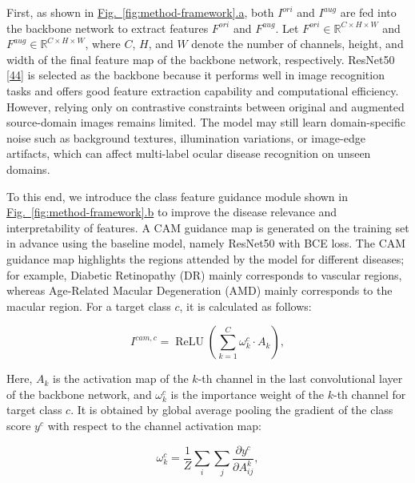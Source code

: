 First, as shown in \hyperref[fig:method-framework]{Fig.~\ref*{fig:method-framework}.a}, both \(I^{ori}\) and \(I^{aug}\) are fed into the backbone network to extract features \(F^{ori}\) and \(F^{aug}\). Let \(F^{ori} \in \mathbb{R}^{C \times H \times W}\) and \(F^{aug} \in \mathbb{R}^{C \times H \times W}\), where \(C\), \(H\), and \(W\) denote the number of channels, height, and width of the final feature map of the backbone network, respectively. ResNet50 \hyperref[_RefResNet2016]{{[}44{]}} is selected as the backbone because it performs well in image recognition tasks and offers good feature extraction capability and computational efficiency. However, relying only on contrastive constraints between original and augmented source-domain images remains limited. The model may still learn domain-specific noise such as background textures, illumination variations, or image-edge artifacts, which can affect multi-label ocular disease recognition on unseen domains.

To this end, we introduce the class feature guidance module shown in \hyperref[fig:method-framework]{Fig.~\ref*{fig:method-framework}.b} to improve the disease relevance and interpretability of features. A CAM guidance map is generated on the training set in advance using the baseline model, namely ResNet50 with BCE loss. The CAM guidance map highlights the regions attended by the model for different diseases; for example, Diabetic Retinopathy (DR) mainly corresponds to vascular regions, whereas Age-Related Macular Degeneration (AMD) mainly corresponds to the macular region. For a target class \(c\), it is calculated as follows:

\begin{equation}\label{eq:cam}
I^{cam,c} = \operatorname{ReLU}\left(\sum_{k = 1}^{C}\omega_{k}^{c} \cdot A_{k}\right),
\end{equation}

Here, \(A_{k}\) is the activation map of the \(k\)-th channel in the last convolutional layer of the backbone network, and \(\omega_{k}^{c}\) is the importance weight of the \(k\)-th channel for target class \(c\). It is obtained by global average pooling the gradient of the class score \(y^{c}\) with respect to the channel activation map:

\begin{equation}\label{eq:cam-weight}
\omega_{k}^{c} = \frac{1}{Z}\sum_i\sum_j \frac{\partial y^{c}}{\partial A_{ij}^{k}},
\end{equation}

